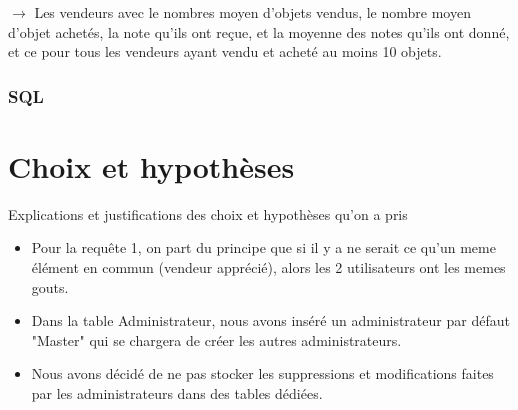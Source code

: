 \documentclass[a4paper,11pt]{article}
\begin{document}
$\rightarrow$ Les vendeurs avec le nombres moyen d'objets vendus, le nombre moyen d'objet achetés, la note qu'ils ont reçue, et la moyenne des notes qu'ils ont donné, et ce pour tous les vendeurs ayant vendu et acheté au moins 10 objets.

\subsubsection{SQL}


\section{Choix et hypothèses}

Explications et justifications des choix et hypothèses qu'on a pris

\begin{itemize}
	\item Pour la requête 1, on part du principe que si il y a ne serait ce qu'un meme élément en commun (vendeur apprécié), alors les 2 utilisateurs ont les memes gouts.
    \item Dans la table Administrateur, nous avons inséré un administrateur par défaut "Master" qui se chargera de créer les autres administrateurs.
    \item Nous avons décidé de ne pas stocker les suppressions et modifications faites par les administrateurs dans des tables dédiées.
   
    
\end{itemize}
\end{document}
